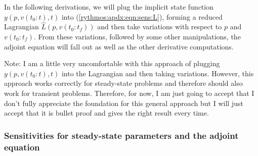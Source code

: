\documentclass[pdf,ps2pdf,11pt]{SANDreport}
\begin{document}
In the following derivations, we will plug the implicit state function
$y(p,v(t_0:t),t)$ into (\ref{rythmos:apdx:eqn:sens:L}), forming a reduced
Lagrangian $\hat{L}(p,v(t_0:t_f))$ and then take variations with
respect to $p$ and $v(t_0:t_f)$.  From these variations, followed by
some other manipulations, the adjoint equation will fall out as well
as the other derivative computations.

Note: I am a little very uncomfortable with this approach of plugging
$y(p,v(t_0:t),t)$ into the Lagrangian and then taking variations.  However,
this approach works correctly for steady-state problems and therefore should
also work for transient problems.  Therefore, for now, I am just going to
accept that I don't fully appreciate the foundation for this general approach
but I will just accept that it is bullet proof and gives the right result
every time.

\subsubsection{Sensitivities for steady-state parameters and the adjoint equation}
\end{document}
